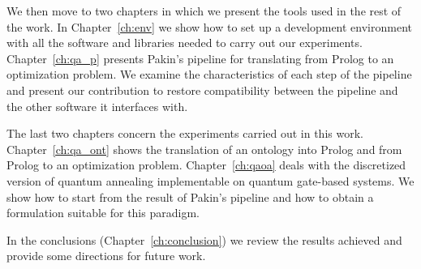 We then move to two chapters in which we present the tools used in the rest of the work. In Chapter~\ref{ch:env} we show how to set up a development environment with all the software and libraries needed to carry out our experiments. Chapter~\ref{ch:qa_p} presents Pakin's pipeline for translating from Prolog to an optimization problem. We examine the characteristics of each step of the pipeline and present our contribution to restore compatibility between the pipeline and the other software it interfaces with.

The last two chapters concern the experiments carried out in this work. Chapter~\ref{ch:qa_ont} shows the translation of an ontology into Prolog and from Prolog to an optimization problem. Chapter~\ref{ch:qaoa} deals with the discretized version of quantum annealing implementable on quantum gate-based systems. We show how to start from the result of Pakin's pipeline and how to obtain a formulation suitable for this paradigm.

In the conclusions (Chapter~\ref{ch:conclusion}) we review the results achieved and provide some directions for future work.

\restoregeometry